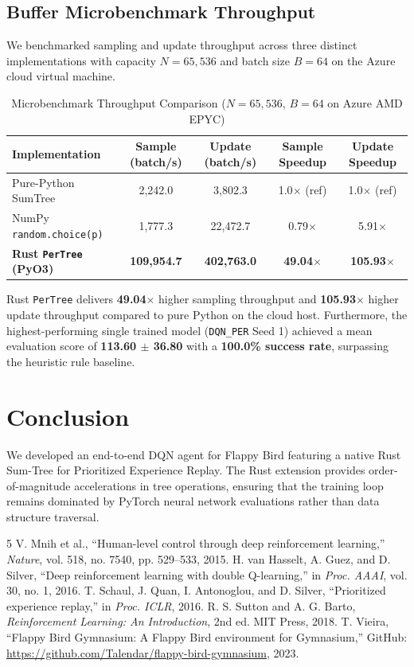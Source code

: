 \documentclass[12pt,a4paper]{article}
\begin{document}
\subsection{Buffer Microbenchmark Throughput}
We benchmarked sampling and update throughput across three distinct implementations with capacity $N = 65,536$ and batch size $B = 64$ on the Azure cloud virtual machine.

\begin{table}[h]
\centering
\caption{Microbenchmark Throughput Comparison ($N = 65,536$, $B = 64$ on Azure AMD EPYC)}
\label{tab:bench}
\small
\begin{tabular}{lcccc}
\toprule
\textbf{Implementation} & \textbf{Sample (batch/s)} & \textbf{Update (batch/s)} & \textbf{Sample Speedup} & \textbf{Update Speedup} \\
\midrule
Pure-Python SumTree & 2,242.0 & 3,802.3 & 1.0$\times$ (ref) & 1.0$\times$ (ref) \\
NumPy \texttt{random.choice(p)} & 1,777.3 & 22,472.7 & 0.79$\times$ & 5.91$\times$ \\
\textbf{Rust \texttt{PerTree} (PyO3)} & \textbf{109,954.7} & \textbf{402,763.0} & \textbf{49.04$\times$} & \textbf{105.93$\times$} \\
\bottomrule
\end{tabular}
\end{table}

Rust \texttt{PerTree} delivers \textbf{49.04$\times$} higher sampling throughput and \textbf{105.93$\times$} higher update throughput compared to pure Python on the cloud host. Furthermore, the highest-performing single trained model (\texttt{DQN\_PER} Seed 1) achieved a mean evaluation score of \textbf{113.60 $\pm$ 36.80} with a \textbf{100.0\% success rate}, surpassing the heuristic rule baseline.

\section{Conclusion}
We developed an end-to-end DQN agent for Flappy Bird featuring a native Rust Sum-Tree for Prioritized Experience Replay. The Rust extension provides order-of-magnitude accelerations in tree operations, ensuring that the training loop remains dominated by PyTorch neural network evaluations rather than data structure traversal.

\begin{thebibliography}{5}
 V. Mnih et al., ``Human-level control through deep reinforcement learning,'' \textit{Nature}, vol. 518, no. 7540, pp. 529--533, 2015.
 H. van Hasselt, A. Guez, and D. Silver, ``Deep reinforcement learning with double Q-learning,'' in \textit{Proc. AAAI}, vol. 30, no. 1, 2016.
 T. Schaul, J. Quan, I. Antonoglou, and D. Silver, ``Prioritized experience replay,'' in \textit{Proc. ICLR}, 2016.
 R. S. Sutton and A. G. Barto, \textit{Reinforcement Learning: An Introduction}, 2nd ed. MIT Press, 2018.
 T. Vieira, ``Flappy Bird Gymnasium: A Flappy Bird environment for Gymnasium,'' GitHub: \url{https://github.com/Talendar/flappy-bird-gymnasium}, 2023.
\end{thebibliography}
\end{document}
